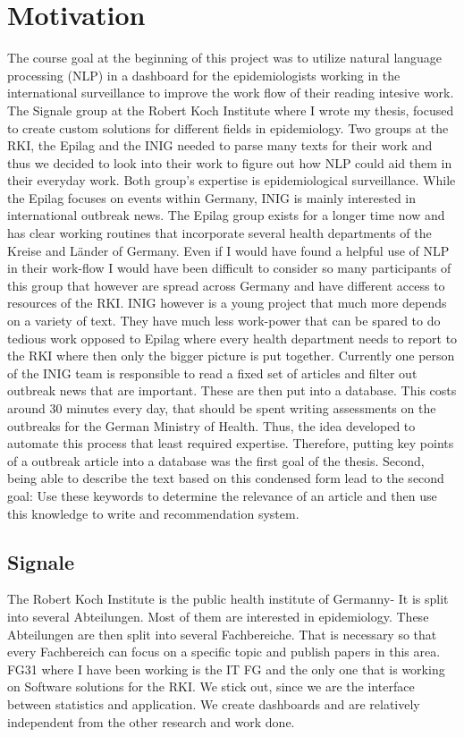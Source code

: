 \section{Motivation}
The course goal at the beginning of this project was to utilize natural language
processing (NLP) in a dashboard for the epidemiologists working in the international
surveillance to improve the work flow of their reading intesive work.
The Signale group at the Robert Koch Institute where I wrote my thesis, focused to create custom solutions for different
fields in epidemiology. Two groups at the RKI, the Epilag and the INIG needed
to parse many texts for their work and thus we decided to look into their work
to figure out how NLP could aid them in their everyday work. Both group’s
expertise is epidemiological surveillance. While the Epilag focuses on events
within Germany, INIG is mainly interested in international outbreak news. The
Epilag group exists for a longer time now and has clear working routines that
incorporate several health departments of the Kreise and Länder of Germany.
Even if I would have found a helpful use of NLP in their work-flow I would have
been difficult to consider so many participants of this group that however are
spread across Germany and have different access to resources of the RKI. INIG
however is a young project that much more depends on a variety of text. They
have much less work-power that can be spared to do tedious work opposed to
Epilag where every health department needs to report to the RKI where then
only the bigger picture is put together. Currently one person of the INIG team
is responsible to read a fixed set of articles and filter out outbreak news that are
important. These are then put into a database. This costs around 30 minutes
every day, that should be spent writing assessments on the outbreaks for the
German Ministry of Health. Thus, the idea developed to automate this process
that least required expertise. Therefore, putting key points of a outbreak article
into a database was the first goal of the thesis. Second, being able to describe the
text based on this condensed form lead to the second goal: Use these keywords
to determine the relevance of an article and then use this knowledge to write
and recommendation system.

\subsection{Signale}
The Robert Koch Institute is the public health institute of Germanny- It is
split into several Abteilungen. Most of them are interested in epidemiology.
These Abteilungen are then split into several Fachbereiche. That is necessary
so that every Fachbereich can focus on a specific topic and publish papers in
this area. FG31 where I have been working is the IT FG and the only one
that is working on Software solutions for the RKI. We stick out, since we are
the interface between statistics and application. We create dashboards and are
relatively independent from the other research and work done.

